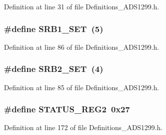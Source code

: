 Definition at line 31 of file Definitions\+\_\+\+A\+D\+S1299.\+h.

\subsubsection[{\texorpdfstring{S\+R\+B1\+\_\+\+S\+ET}{SRB1_SET}}]{\setlength{\rightskip}{0pt plus 5cm}\#define S\+R\+B1\+\_\+\+S\+ET~(5)}\hypertarget{group__Definitions__ADS1299_ga62cf1daadcbe15df7a2ad3613c9808fd}{}\label{group__Definitions__ADS1299_ga62cf1daadcbe15df7a2ad3613c9808fd}


Definition at line 86 of file Definitions\+\_\+\+A\+D\+S1299.\+h.

\subsubsection[{\texorpdfstring{S\+R\+B2\+\_\+\+S\+ET}{SRB2_SET}}]{\setlength{\rightskip}{0pt plus 5cm}\#define S\+R\+B2\+\_\+\+S\+ET~(4)}\hypertarget{group__Definitions__ADS1299_ga097bb3289a6ee33d5cf993e8d35cf951}{}\label{group__Definitions__ADS1299_ga097bb3289a6ee33d5cf993e8d35cf951}


Definition at line 85 of file Definitions\+\_\+\+A\+D\+S1299.\+h.

\subsubsection[{\texorpdfstring{S\+T\+A\+T\+U\+S\+\_\+\+R\+E\+G2}{STATUS_REG2}}]{\setlength{\rightskip}{0pt plus 5cm}\#define S\+T\+A\+T\+U\+S\+\_\+\+R\+E\+G2~0x27}\hypertarget{group__Definitions__ADS1299_gac5289782d4398220ff718751de7e8f15}{}\label{group__Definitions__ADS1299_gac5289782d4398220ff718751de7e8f15}


Definition at line 172 of file Definitions\+\_\+\+A\+D\+S1299.\+h.

